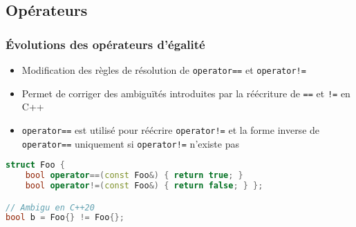 \documentclass[C++.tex]{subfiles}
\begin{document}
\subsection*{Opérateurs}
\begin{frame}[fragile]
	\frametitle{Évolutions des opérateurs d'égalité}
	\begin{itemize}
		\item Modification des règles de résolution de \lstinline|operator==| et \lstinline|operator!=|
		\item Permet de corriger des ambiguïtés introduites par la réécriture de \lstinline|==| et \lstinline|!=| en C++


		\item \lstinline|operator==| est utilisé pour réécrire \lstinline|operator!=| et la forme inverse de \lstinline|operator==| uniquement si \lstinline|operator!=| n'existe pas 
	\end{itemize}

\begin{lstlisting}[language=C++]
struct Foo {
	bool operator==(const Foo&) { return true; }
	bool operator!=(const Foo&) { return false; } };

// Ambigu en C++20
bool b = Foo{} != Foo{};\end{lstlisting}


\end{frame}
\end{document}
